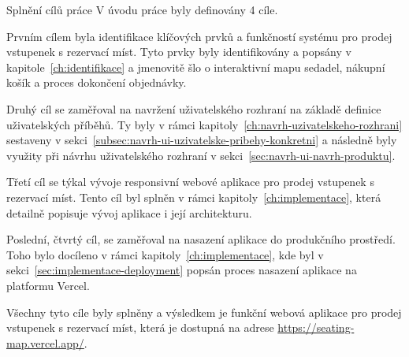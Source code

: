 \begin{section}{Splnění cílů práce}
    \label{sec:zaver-cile}
    V úvodu práce byly definovány 4 cíle.

    Prvním cílem byla identifikace klíčových prvků a funkčností systému pro prodej vstupenek s rezervací míst.
    Tyto prvky byly identifikovány a popsány v kapitole~\ref{ch:identifikace} a jmenovitě šlo o interaktivní mapu sedadel, nákupní košík a proces dokončení objednávky.

    Druhý cíl se zaměřoval na navržení uživatelského rozhraní na základě definice uživatelských příběhů.
    Ty byly v rámci kapitoly~\ref{ch:navrh-uzivatelskeho-rozhrani} sestaveny v sekci~\ref{subsec:navrh-ui-uzivatelske-pribehy-konkretni} a následně byly využity při návrhu uživatelského rozhraní v sekci~\ref{sec:navrh-ui-navrh-produktu}.

    Třetí cíl se týkal vývoje responsivní webové aplikace pro prodej vstupenek s rezervací míst.
    Tento cíl byl splněn v rámci kapitoly~\ref{ch:implementace}, která detailně popisuje vývoj aplikace i její architekturu.

    Poslední, čtvrtý cíl, se zaměřoval na nasazení aplikace do produkčního prostředí.
    Toho bylo docíleno v rámci kapitoly~\ref{ch:implementace}, kde byl v sekci~\ref{sec:implementace-deployment} popsán proces nasazení aplikace na platformu Vercel.

    Všechny tyto cíle byly splněny a výsledkem je funkční webová aplikace pro prodej vstupenek s rezervací míst, která je dostupná na adrese \url{https://seating-map.vercel.app/}.
\end{section}

